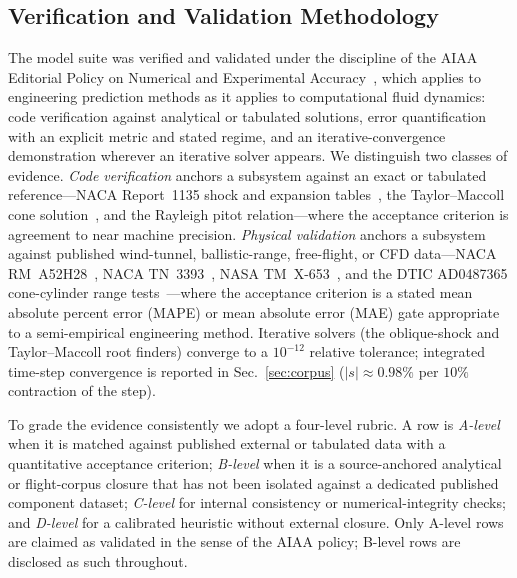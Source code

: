 
\subsection{Verification and Validation Methodology}
\label{subsec:vv-method}

The model suite was verified and validated under the discipline of the AIAA
Editorial Policy on Numerical and Experimental Accuracy~\cite{aiaa_numerical_policy},
which applies to engineering prediction methods as it applies to computational
fluid dynamics: code verification against analytical or tabulated solutions,
error quantification with an explicit metric and stated regime, and an
iterative-convergence demonstration wherever an iterative solver appears. We
distinguish two classes of evidence. \emph{Code verification} anchors a
subsystem against an exact or tabulated reference---NACA Report~1135 shock and
expansion tables~\cite{naca1135}, the Taylor--Maccoll cone solution~\cite{taylormaccoll1933,anderson2006},
and the Rayleigh pitot relation---where the acceptance criterion is agreement to
near machine precision. \emph{Physical validation} anchors a subsystem against
published wind-tunnel, ballistic-range, free-flight, or CFD data---NACA
RM~A52H28~\cite{a52h28}, NACA TN~3393~\cite{chapman1955}, NASA TM~X-653~\cite{nielsen1962},
and the DTIC AD0487365 cone-cylinder range tests~\cite{grabow1965}---where the
acceptance criterion is a stated mean absolute percent error (MAPE) or mean
absolute error (MAE) gate appropriate to a semi-empirical engineering method.
Iterative solvers (the oblique-shock and Taylor--Maccoll root finders) converge
to a $10^{-12}$ relative tolerance; integrated time-step convergence is reported
in Sec.~\ref{sec:corpus} ($\lvert s\rvert \approx 0.98\%$ per $10\%$ contraction
of the step).

To grade the evidence consistently we adopt a four-level rubric. A row is
\emph{A-level} when it is matched against published external or tabulated data
with a quantitative acceptance criterion; \emph{B-level} when it is a
source-anchored analytical or flight-corpus closure that has not been isolated
against a dedicated published component dataset; \emph{C-level} for internal
consistency or numerical-integrity checks; and \emph{D-level} for a calibrated
heuristic without external closure. Only A-level rows are claimed as validated
in the sense of the AIAA policy; B-level rows are disclosed as such throughout.

